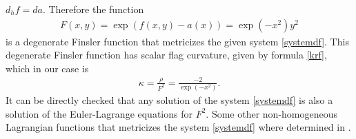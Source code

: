 \documentclass[oneside,english]{amsart}
\numberwithin{equation}{section}
\numberwithin{figure}{section}
\theoremstyle{plain}
\theoremstyle{plain}
\theoremstyle{definition}
\theoremstyle{plain}
\theoremstyle{plain}
\theoremstyle{plain}
\theoremstyle{remark}
\theoremstyle{remark}
\begin{document}
$d_hf=da$.  Therefore the function  
\begin{eqnarray*}
  F(x,y)=\exp(f(x,y)-a(x))=\exp(-x^2)y^2 \end{eqnarray*} is a degenerate
Finsler function that metricizes the given system \eqref{systemdf}.
This degenerate Finsler function has scalar flag curvature, given by formula
\eqref{krf}, which in our case is
\begin{eqnarray*}
  \kappa = \frac{\rho}{F^2}= \frac{-2}{\exp(-x^2)}. \end{eqnarray*}
It can be directly checked that any solution of the system
\eqref{systemdf} is also a solution of the Euler-Lagrange equations
for $F^2$. Some other non-homogeneous Lagrangian functions that
metricizes the system \eqref{systemdf} where determined in \cite[Ex. 7.10]{AT92}. 
\end{document}
